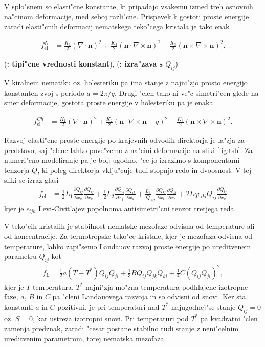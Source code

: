 \documentclass[a4paper,10pt]{article}
\newcommand{\todo}[1]{(\textbf{\textsmaller{TODO}: #1})}
\renewcommand{\vec}{\mathbf}
\newcommand{\qodv}[2]{\ensuremath{\frac{\partial Q_{#1}}{\partial x_{#2}}}}
\begin{document}
V splo"snem so elasti"cne konstante, ki pripadajo vsakemu izmed treh osnovnih na"cinom deformacije, med seboj razli"cne. 
Prispevek k gostoti proste energije zaradi elasti"cnih deformacij nematskega teko"cega kristala je tako enak

\begin{align}
 f_{\mathrm{el}}^N &= \frac{K_1}{2} (\nabla \cdot \vec n)^2 + \frac{K_2}{2} (\vec n \cdot \nabla \times \vec n)^2 + \frac{K_3}{2} (\vec n \times \nabla \times \vec n)^2. 
\end{align}

\todo{tipi"cne vrednosti konstant}, \todo{izra"zava s $Q_{ij}$}

V kiralnem nematiku oz. holesteriku pa ima stanje z najni"zjo prosto energijo konstanten zvoj s periodo $a = 2\pi / q$.
Drugi "clen tako ni ve"c simetri"cen glede na smer deformacije, gostota proste energije v holesteriku pa je enaka

\begin{align}
 f_{\mathrm{el}}^{Ch} &= \frac{K_1}{2} (\nabla \cdot \vec n)^2 + \frac{K_2}{2} (\vec n \cdot \nabla \times \vec n - q)^2 + \frac{K_3}{2} (\vec n \times \nabla \times \vec n)^2. 
\end{align}

Razvoj elasti"cne proste energije po krajevnih odvodih direktorja je la"zja za predstavo, saj "clene lahko pove"zemo z na"cini deformacije na sliki \ref{fig:tsb}. 
Za numeri"cno modeliranje pa je bolj ugodno, "ce jo izrazimo s komponentami tenzorja $Q$, ki poleg direktorja vklju"cuje tudi stopnjo redo in dvoosnost\cite{copar-phd}. 
V tej sliki se izraz glasi
\begin{align}
 f_{\mathrm{el}} &= \frac{1}{2}L_1\qodv{ij}{k}\qodv{ij}{k} + \frac{1}{2}L_2 \qodv{ij}{j}\qodv{ik}{k} + \frac{L_3}Q_{ij}\qodv{kl}{i}\qodv{kl}{l} + 2Lq\epsilon_{ikl}Q_{ij}\qodv{lj}{k}
\end{align}
kjer je $\epsilon_{ijk}$ Levi-Civit'ajev popolnoma antisimetri"cni tenzor tretjega reda. 


V teko"cih kristalih je stabilnost nematske mezofaze odvisna od temperature ali od koncentracije. 
Za termotropske teko"ce kristale, kjer je mezofaza odvisna od temperature, lahko zapi"semo Landauov razvoj proste energije po ureditvenem parametru $Q_{ij}$ kot
\begin{align}
  f_{\mathrm{L}} = \frac{1}{2}a(T-T^*)Q_{ij}Q_{ji} + \frac{1}{3}BQ_{ij}Q_{jk}Q_{ki} + \frac{1}{4}C(Q_{ij}Q_{ji})^2,
\end{align}
kjer je $T$ temperatura, $T^*$ najni"zja mo"zna temperatura podhlajene izotropne faze, $a$, $B$ in $C$ pa "cleni Landauovega razvoja in so odvisni od snovi. 
Ker sta konstanti $a$ in $C$ pozitivni, je pri temperaturi nad $T^*$ najugodnej"se stanje $Q_{ij}=0$ oz. $S=0$, kar ustreza izotropni snovi. 
Pri temperaturi pod $T^*$ pa kvadratni "clen zamenja predznak, zaradi "cesar postane stabilno tudi stanje z neni"celnim ureditvenim parametrom, torej nematska mezofaza. 
\end{document}

